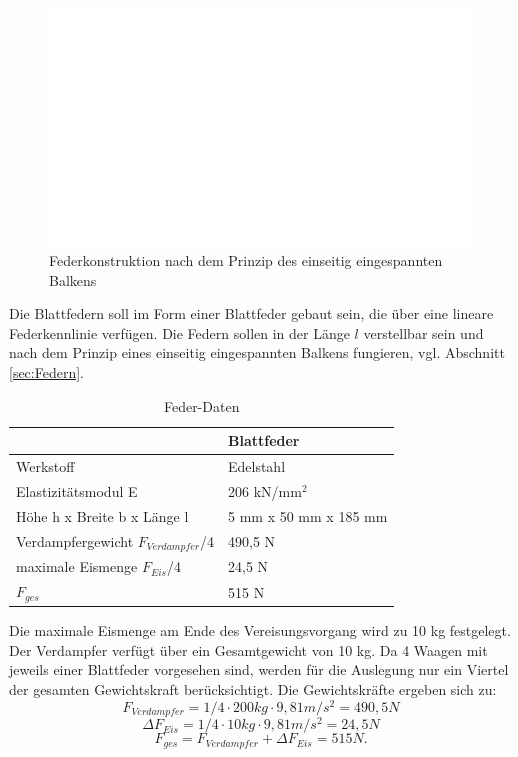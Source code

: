 \begin{figure}
\centering		\includegraphics[page=7,width=1.10\textwidth]{Pictures/Feder.pdf}
\caption{Federkonstruktion nach dem Prinzip des einseitig eingespannten Balkens}
\label{fig:Feder}
\end{figure}






Die Blattfedern soll im Form einer Blattfeder gebaut sein, die über eine lineare Federkennlinie verfügen. Die Federn sollen in der Länge $l$ verstellbar sein und nach dem Prinzip eines einseitig eingespannten Balkens fungieren, vgl. Abschnitt \ref{sec:Federn}. 

 
\begin{table}[htb]
\centering
\caption{Feder-Daten}\vspace{6pt}
\begin{tabular}{ll}
\hline 
 & \textbf{Blattfeder}  \\ 
\hline 
\hline 
Werkstoff & Edelstahl\\
\hline 
Elastizitätsmodul E & 206 kN/mm$^2$ \\ 
\hline 
Höhe h x Breite b x Länge l & 5 mm x 50 mm x 185 mm\\
\hline
Verdampfergewicht $F_{Verdampfer}$/4 & 490,5 N\\
\hline
maximale Eismenge $F_{Eis}$/4 & 24,5 N\\
\hline
$F_{ges}$ & 515 N\\
\hline
\hline
\end{tabular} 
\label{tab:Federblattereigenschaften}
\end{table}

Die maximale Eismenge am Ende des Vereisungsvorgang wird zu 10 kg festgelegt. Der Verdampfer verfügt über ein Gesamtgewicht von 10 kg. Da 4 Waagen mit jeweils einer Blattfeder vorgesehen sind, werden für die Auslegung nur ein Viertel der gesamten Gewichtskraft berücksichtigt.  Die Gewichtskräfte ergeben sich zu:
\begin{equation*}
F_{Verdampfer}= 1/4\cdot 200 kg \cdot 9,81 m/s^2 = 490,5 N
\end{equation*}
\begin{equation*}
\Delta F_{Eis}= 1/4 \cdot 10 kg \cdot 9,81 m/s^2 = 24,5 N
\end{equation*}
\begin{equation*}
F_{ges}= F_{Verdampfer} + \Delta F_{Eis} = 515 N.
\end{equation*}

